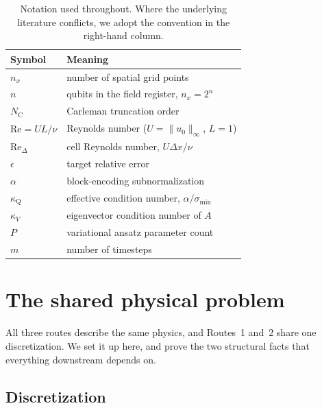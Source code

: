 \documentclass[aps,prx,twocolumn,notitlepage,superscriptaddress,floatfix,10pt]{revtex4-2}
\newcommand{\norm}[1]{\lVert #1 \rVert}
\newcommand{\Rey}{\mathrm{Re}}
\newcommand{\NC}{N_{\mathrm{C}}}
\newcommand{\kQ}{\kappa_{\mathrm{Q}}}
\begin{document}
\begin{table}[t]
\caption{Notation used throughout. Where the underlying literature conflicts, we adopt the
convention in the right-hand column.}
\label{tab:notation}
\begin{ruledtabular}
\begin{tabular}{ll}
Symbol & Meaning \\
\hline
$n_x$ & number of spatial grid points \\
$n$ & qubits in the field register, $n_x=2^n$ \\
$\NC$ & Carleman truncation order \\
$\Rey=UL/\nu$ & Reynolds number ($U=\norm{u_0}_\infty$, $L=1$) \\
$\Rey_\Delta$ & cell Reynolds number, $U\Delta x/\nu$ \\
$\epsilon$ & target relative error \\
$\alpha$ & block-encoding subnormalization \\
$\kQ$ & effective condition number, $\alpha/\sigma_{\min}$ \\
$\kappa_V$ & eigenvector condition number of $A$ \\
$P$ & variational ansatz parameter count \\
$m$ & number of timesteps \\
\end{tabular}
\end{ruledtabular}
\end{table}

\section{The shared physical problem}
\label{sec:discretization}

All three routes describe the same physics, and Routes~1 and~2 share one discretization. We set it up
here, and prove the two structural facts that everything downstream depends on.

\subsection{Discretization}
\end{document}
